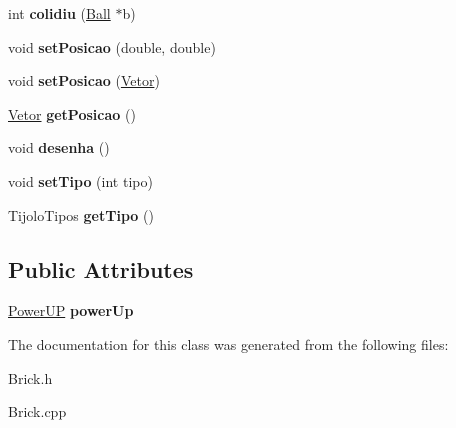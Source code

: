 \begin{DoxyCompactItemize}
\item 
\hypertarget{classBrick_a2d4a47982dd191d68e2872bd8ef3c9f2}{int {\bfseries colidiu} (\hyperlink{classBall}{\-Ball} $\ast$b)}\label{classBrick_a2d4a47982dd191d68e2872bd8ef3c9f2}

\item 
\hypertarget{classBrick_a936a6f9ebd8ea9fbe10f909479183f98}{void {\bfseries set\-Posicao} (double, double)}\label{classBrick_a936a6f9ebd8ea9fbe10f909479183f98}

\item 
\hypertarget{classBrick_abb1b859e2eb586f0aaa1a47891b7123a}{void {\bfseries set\-Posicao} (\hyperlink{classVetor}{\-Vetor})}\label{classBrick_abb1b859e2eb586f0aaa1a47891b7123a}

\item 
\hypertarget{classBrick_a58af58ab61e5780d52dc017cf5471a2b}{\hyperlink{classVetor}{\-Vetor} {\bfseries get\-Posicao} ()}\label{classBrick_a58af58ab61e5780d52dc017cf5471a2b}

\item 
\hypertarget{classBrick_a849a7df3b1516fad2108891c9f29d5da}{void {\bfseries desenha} ()}\label{classBrick_a849a7df3b1516fad2108891c9f29d5da}

\item 
\hypertarget{classBrick_ad6a3eab2ca79d0372412ed337b57e91b}{void {\bfseries set\-Tipo} (int tipo)}\label{classBrick_ad6a3eab2ca79d0372412ed337b57e91b}

\item 
\hypertarget{classBrick_a9dc76c43b764cf62ea9b8c38b0aba7e7}{\-Tijolo\-Tipos {\bfseries get\-Tipo} ()}\label{classBrick_a9dc76c43b764cf62ea9b8c38b0aba7e7}

\end{DoxyCompactItemize}
\subsection*{\-Public \-Attributes}
\begin{DoxyCompactItemize}
\item 
\hypertarget{classBrick_a84e3bc7a2f44f33d4f531e146c548a7a}{\hyperlink{classPowerUP}{\-Power\-U\-P} {\bfseries power\-Up}}\label{classBrick_a84e3bc7a2f44f33d4f531e146c548a7a}

\end{DoxyCompactItemize}


\-The documentation for this class was generated from the following files\-:\begin{DoxyCompactItemize}
\item 
\-Brick.\-h\item 
\-Brick.\-cpp\end{DoxyCompactItemize}
